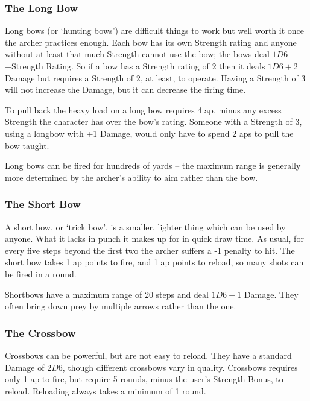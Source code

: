 \begin{multicols}{2}
\subsubsection{The Long Bow}
\label{longbow}

Long bows (or `hunting bows') are difficult things to work but well worth it once the archer practices enough.
Each bow has its own Strength rating and anyone without at least that much Strength cannot use the bow; the bows deal $1D6$ +Strength Rating.
So if a bow has a Strength rating of 2 then it deals $1D6+2$ Damage but requires a Strength of 2, at least, to operate.
Having a Strength of 3 will not increase the Damage, but it can decrease the firing time.

To pull back the heavy load on a long bow requires 4 \gls{ap}, minus any excess Strength the character has over the bow's rating.
Someone with a Strength of 3, using a longbow with +1 Damage, would only have to spend 2 \glspl{ap} to pull the bow taught.

Long bows can be fired for hundreds of yards -- the maximum range is generally more determined by the archer's ability to aim rather than the bow.

\subsubsection{The Short Bow}

A short bow, or `trick bow', is a smaller, lighter thing which can be used by anyone.
What it lacks in punch it makes up for in quick draw time.
As usual, for every five steps beyond the first two the archer suffers a -1 penalty to hit.
The short bow takes 1 \gls{ap} points to fire, and 1 \gls{ap} points to reload, so many shots can be fired in a \gls{round}.

Shortbows have a maximum range of 20 steps and deal $1D6-1$ Damage.
They often bring down prey by multiple arrows rather than the one.

\subsubsection{The Crossbow}
\label{crossbow}
Crossbows can be powerful, but are not easy to reload.
They have a standard Damage of $2D6$, though different crossbows vary in quality.
Crossbows requires only 1 \gls{ap} to fire, but require 5 rounds, minus the user's Strength Bonus, to reload. Reloading always takes a minimum of 1 round.


\end{multicols}
